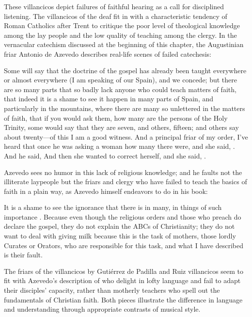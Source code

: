 These villancicos depict failures of faithful hearing as a call for disciplined
listening.
The villancicos of the deaf fit in with a characteristic tendency of Roman
Catholics after Trent to critique the poor level of theological knowledge among
the lay people and the low quality of teaching among the clergy.%
    \Autocite[56--57]{Kamen:EarlyModernSociety}
In the vernacular catechism discussed at the beginning of this chapter, the
Augustinian friar Antonio de Azevedo describes real-life scenes of failed
catechesis: 
\begin{quoting}
    Some will say that the doctrine of the gospel has already been taught
    everywhere or almost everywhere (I am speaking of our Spain), and we
    concede; but there are so many parts that so badly lack anyone who could
    teach matters of faith, that indeed it is a shame to see it happen in many
    parts of Spain, and particularly in the mountains, where there are many so
    unlettered  in the matters of faith, that if you would ask
    them, how many are the persons of the Holy Trinity, some would say that they
    are seven, and others, fifteen; and others say about twenty---of this I am a
    good witness.
    And a principal friar of my order, I've heard that once he was asking a
    woman how many  there were, and she said,
    . 
    And he said,  
    And then she wanted to correct herself, and she said, .%
        \Autocite[26]{Azevedo:Catecismo}
\end{quoting}
Azevedo sees no humor in this lack of religious knowledge; and he faults not the
illiterate laypeople but the friars and clergy who have failed to teach the
basics of faith in a plain way, as Azevedo himself endeavors to do in his book:
\begin{quoting}
    It is a shame to see the ignorance that there is in many, in things of such
    importance \Dots{}.
    Because even though the religious orders and those who preach do declare the
    gospel, they do not explain the ABCs  of Christianity;
    they do not want to deal with giving milk because this is the task of
    mothers, those lordly Curates or Orators, who are responsible for this task,
    and what I have described is their fault.%
        \Autocite[27]{Azevedo:Catecismo}
\end{quoting}
The friars of the villancicos by Gutiérrez de Padilla and Ruiz villancicos seem
to fit with Azevedo's description of  who delight in
lofty language and fail to adapt their disciples' capacity, rather than motherly
teachers who spell out the fundamentals of Christian faith.
Both pieces illustrate the difference in language and understanding through
appropriate contrasts of musical style.

